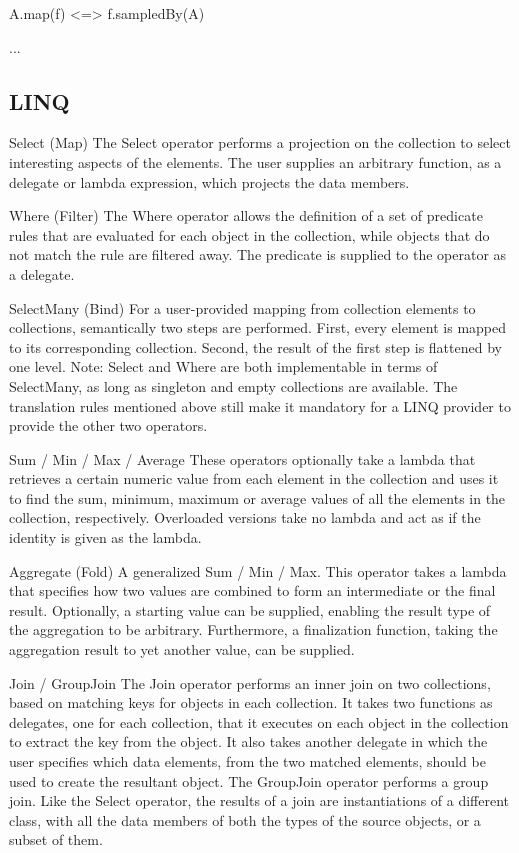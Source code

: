     A.map(f) <=> f.sampledBy(A)


    ...

  \subsection{LINQ}

    Select (Map)
      The Select operator performs a projection on the collection to select interesting aspects of the elements. The user supplies an arbitrary function, as a delegate or lambda expression, which projects the data members.

    Where (Filter)
      The Where operator allows the definition of a set of predicate rules that are evaluated for each object in the collection, while objects that do not match the rule are filtered away. The predicate is supplied to the operator as a delegate.

    SelectMany (Bind)
      For a user-provided mapping from collection elements to collections, semantically two steps are performed. First, every element is mapped to its corresponding collection. Second, the result of the first step is flattened by one level. Note: Select and Where are both implementable in terms of SelectMany, as long as singleton and empty collections are available. The translation rules mentioned above still make it mandatory for a LINQ provider to provide the other two operators.

    Sum / Min / Max / Average
      These operators optionally take a lambda that retrieves a certain numeric value from each element in the collection and uses it to find the sum, minimum, maximum or average values of all the elements in the collection, respectively. Overloaded versions take no lambda and act as if the identity is given as the lambda.

    Aggregate (Fold)
      A generalized Sum / Min / Max. This operator takes a lambda that specifies how two values are combined to form an intermediate or the final result. Optionally, a starting value can be supplied, enabling the result type of the aggregation to be arbitrary. Furthermore, a finalization function, taking the aggregation result to yet another value, can be supplied.

    Join / GroupJoin
      The Join operator performs an inner join on two collections, based on matching keys for objects in each collection. It takes two functions as delegates, one for each collection, that it executes on each object in the collection to extract the key from the object. It also takes another delegate in which the user specifies which data elements, from the two matched elements, should be used to create the resultant object. The GroupJoin operator performs a group join. Like the Select operator, the results of a join are instantiations of a different class, with all the data members of both the types of the source objects, or a subset of them.

